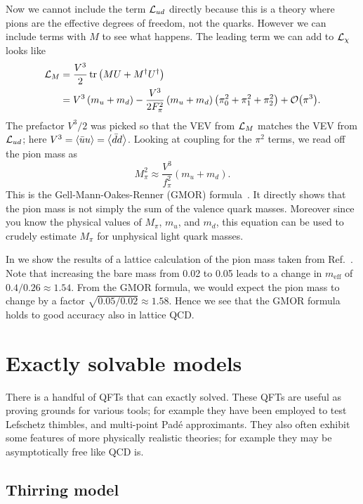 Now we cannot include the term $\mathcal{L}_{ud}$ directly because this is a theory
where pions are the effective degrees of freedom, not the quarks. However we can
include terms with $M$ to see what happens. The leading term we can add to
$\mathcal{L}_\chi$ looks like
\begin{equation}
\begin{aligned}
\Lagr_M & =\frac{V^3}{2} \operatorname{tr}\left(M U+M^{\dagger} U^{\dagger}\right) \\
& =V^3\left(m_u+m_d\right)-\frac{V^3}{2
F_\pi^2}\left(m_u+m_d\right)\left(\pi_0^2+\pi_1^2+\pi_2^2\right)+\order{\pi^3} .
\end{aligned}
\end{equation}
The prefactor $V^3/2$ was picked so that the VEV from $\mathcal{L}_M$ matches the VEV
from $\mathcal{L}_{ud}$; here $V^3=\ev{\bar{u}u}=\ev{\bar{d}d}$. Looking at coupling
for the $\pi^2$ terms, we read off the pion mass as
\begin{equation}
  M_\pi^2\approx \frac{V^3}{f_\pi^2}(m_u+m_d).
\end{equation}
This is the Gell-Mann-Oakes-Renner (GMOR)
formula~\cite{gell-mann_behavior_1968}.
It directly shows that the pion mass is not simply the sum of
the valence quark masses. Moreover since you know the physical values
of $M_\pi$, $m_u$, and $m_d$, this equation can be used to crudely estimate
$M_\pi$ for unphysical light quark masses.

In  we show the results of a lattice calculation of the pion
mass taken from Ref.~\cite{gattringer_quantum_2010}. Note that increasing the
bare mass from 0.02 to 0.05 leads to a change in $m_\text{eff}$ of
$0.4/0.26\approx1.54$. From the GMOR formula, we would expect the pion mass to
change by a factor $\sqrt{0.05/0.02}\approx1.58$. Hence we see that the GMOR
formula holds to good accuracy also in lattice QCD.

\section{Exactly solvable models}

There is a handful of QFTs that can exactly solved. These QFTs are useful
as proving grounds for various tools; for example they have been employed to
test Lefschetz thimbles, and multi-point Pad\'e approximants.
They also often exhibit some features of more physically realistic theories;
for example they may be asymptotically free like QCD is.

\subsection{Thirring model}\label{sec:Thirring}

